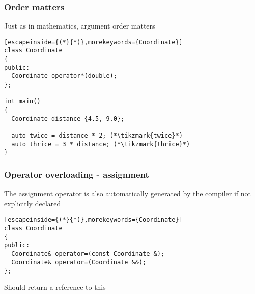 \documentclass[14pt,a4paper,dvipsnames,usenames]{beamer}
\begin{document}
\begin{frame}[fragile]
  \frametitle{Order matters}

  Just as in mathematics, argument order matters

  \vspace{.3em}
  \begin{lstlisting}[escapeinside={(*}{*)},morekeywords={Coordinate}]
class Coordinate
{
public:
  Coordinate operator*(double);
};

int main()
{
  Coordinate distance {4.5, 9.0};

  auto twice = distance * 2; (*\tikzmark{twice}*)
  auto thrice = 3 * distance; (*\tikzmark{thrice}*)
}
  \end{lstlisting}

  \nointerlineskip

\end{frame}

\begin{frame}[fragile]
  \frametitle{Operator overloading - assignment}

  The assignment operator is also automatically generated by the compiler if not explicitly declared

  \vspace{.5em}
  \begin{lstlisting}[escapeinside={(*}{*)},morekeywords={Coordinate}]
class Coordinate
{
public:
  Coordinate& operator=(const Coordinate &);
  Coordinate& operator=(Coordinate &&);
};
  \end{lstlisting}

  \vspace{.5em}
  Should return a reference to {\color{FeebleWeek}this}
  
\end{frame}
\end{document}
